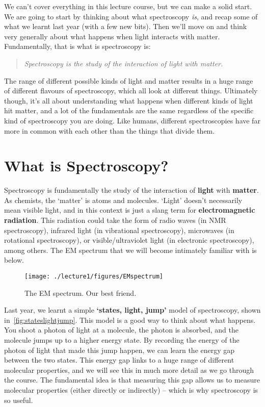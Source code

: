 We can't cover everything in this lecture course, but we can make a solid start. We are going to start by thinking about what spectroscopy \textit{is}, and recap some of what we learnt last year (with a few new bits). Then we'll move on and think very generally about what happens when light interacts with matter. Fundamentally, that is what is spectroscopy is:
\begin{quote}
\textit{Spectroscopy is the study of the interaction of light with matter.}
\end{quote}

The range of different possible kinds of light and matter results in a huge range of different flavours of spectroscopy, which all look at different things. Ultimately though, it's all about understanding what happens when different kinds of light hit matter, and a lot of the fundamentals are the same regardless of the specific kind of spectroscopy you are doing. Like humans, different spectroscopies have far more in common with each other than the things that divide them.



\section{What is Spectroscopy?}
Spectroscopy is fundamentally the study of the interaction of \textbf{light} with \textbf{matter}. As chemists, the `matter' is atoms and molecules. `Light' doesn't necessarily mean visible light, and in this context is just a slang term for \textbf{electromagnetic radiation}. This radiation could take the form of radio waves (in NMR spectroscopy), infrared light (in vibrational spectroscopy), microwaves (in rotational spectroscopy), or visible/ultraviolet light (in electronic spectroscopy), among others. The EM spectrum that we will become intimately familiar with is below.
\begin{figure}[h!]
\centering
\texttt{[image: ./lecture1/figures/EMspectrum]}
\caption{The EM spectrum. Our best friend.}
\end{figure}

Last year, we learnt a simple \textbf{`states, light, jump'} model of spectroscopy, shown in~\autoref{fig:stateslightjump}. This model is a good way to think about what happens. You shoot a photon of light at a molecule, the photon is absorbed, and the molecule jumps up to a higher energy state. By recording the energy of the photon of light that made this jump happen, we can learn the energy gap between the two states. This energy gap links to a huge range of different molecular properties, and we will see this in much more detail as we go through the course. The fundamental idea is that measuring this gap allows us to measure molecular properties (either directly or indirectly) -- which is why spectroscopy is so useful.

